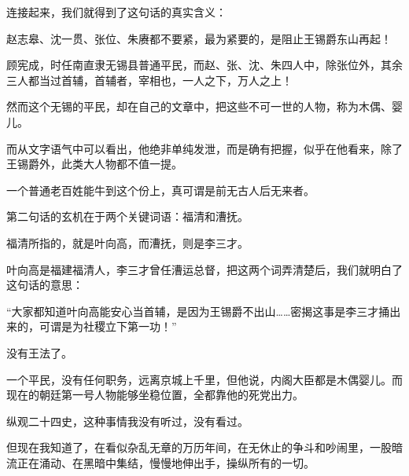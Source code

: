 \begin{multicols}{\theparacolNo}
		连接起来，我们就得到了这句话的真实含义：

		赵志皋、沈一贯、张位、朱赓都不要紧，最为紧要的，是阻止王锡爵东山再起！

		顾宪成，时任南直隶无锡县普通平民，而赵、张、沈、朱四人中，除张位外，其余三人都当过首辅，首辅者，宰相也，一人之下，万人之上！

		然而这个无锡的平民，却在自己的文章中，把这些不可一世的人物，称为木偶、婴儿。

		而从文字语气中可以看出，他绝非单纯发泄，而是确有把握，似乎在他看来，除了王锡爵外，此类大人物都不值一提。

		一个普通老百姓能牛到这个份上，真可谓是前无古人后无来者。

		第二句话的玄机在于两个关键词语：福清和漕抚。

		福清所指的，就是叶向高，而漕抚，则是李三才。

		叶向高是福建福清人，李三才曾任漕运总督，把这两个词弄清楚后，我们就明白了这句话的意思：

		“大家都知道叶向高能安心当首辅，是因为王锡爵不出山……密揭这事是李三才捅出来的，可谓是为社稷立下第一功！”

		没有王法了。

		一个平民，没有任何职务，远离京城上千里，但他说，内阁大臣都是木偶婴儿。而现在的朝廷第一号人物能够坐稳位置，全都靠他的死党出力。

		纵观二十四史，这种事情我没有听过，没有看过。

		但现在我知道了，在看似杂乱无章的万历年间，在无休止的争斗和吵闹里，一股暗流正在涌动、在黑暗中集结，慢慢地伸出手，操纵所有的一切。
		\ifnum{}
	\end{multicols}
\fi
\newpage
